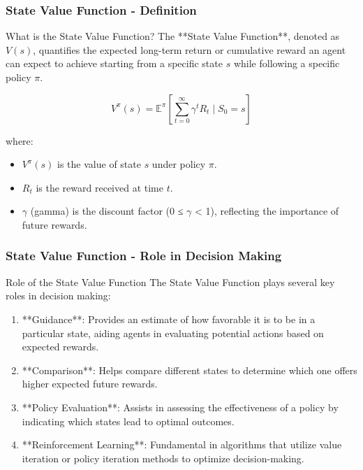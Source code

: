 \documentclass[aspectratio=169]{beamer}
\begin{document}
\begin{frame}[fragile]
    \frametitle{State Value Function - Definition}
    \begin{block}{What is the State Value Function?}
        The **State Value Function**, denoted as \( V(s) \), quantifies the expected long-term return or cumulative reward an agent can expect to achieve starting from a specific state \( s \) while following a specific policy \( \pi \).
    \end{block}
    
    \begin{equation}
        V^{\pi}(s) = \mathbb{E}^{\pi} \left[ \sum_{t=0}^{\infty} \gamma^t R_t \mid S_0 = s \right]
    \end{equation}
    
    where:
    \begin{itemize}
        \item \( V^{\pi}(s) \) is the value of state \( s \) under policy \( \pi \).
        \item \( R_t \) is the reward received at time \( t \).
        \item \( \gamma \) (gamma) is the discount factor (0 ≤ \( \gamma \) < 1), reflecting the importance of future rewards.
    \end{itemize}
\end{frame}

\begin{frame}[fragile]
    \frametitle{State Value Function - Role in Decision Making}
    \begin{block}{Role of the State Value Function}
        The State Value Function plays several key roles in decision making:
    \end{block}
    
    \begin{enumerate}
        \item **Guidance**: Provides an estimate of how favorable it is to be in a particular state, aiding agents in evaluating potential actions based on expected rewards.
        
        \item **Comparison**: Helps compare different states to determine which one offers higher expected future rewards.
        
        \item **Policy Evaluation**: Assists in assessing the effectiveness of a policy by indicating which states lead to optimal outcomes.
        
        \item **Reinforcement Learning**: Fundamental in algorithms that utilize value iteration or policy iteration methods to optimize decision-making.
    \end{enumerate}
\end{frame}
\end{document}
